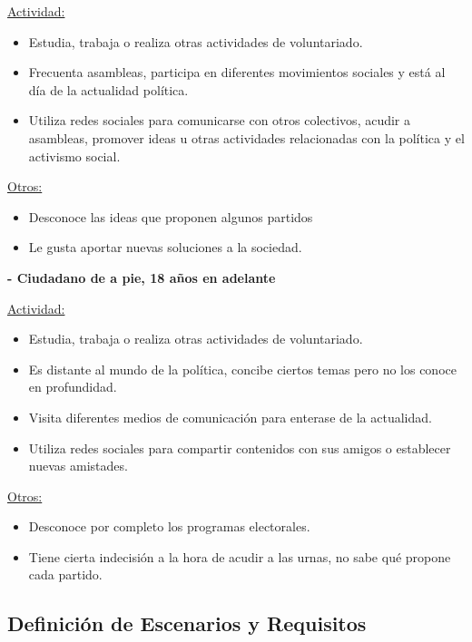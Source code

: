 \underline{Actividad:}

\begin{itemize}
\item Estudia, trabaja o realiza otras actividades de voluntariado.
\item Frecuenta asambleas, participa en diferentes movimientos sociales y está al día de la actualidad política.
\item Utiliza redes sociales para comunicarse con otros colectivos, acudir a asambleas, promover ideas u otras actividades relacionadas con la política y el activismo social.
\end{itemize}

\underline{Otros:}

\begin{itemize}
\item Desconoce las ideas que proponen algunos partidos 
\item Le gusta aportar nuevas soluciones a la sociedad.
\end{itemize}

\textbf{- Ciudadano de a pie, 18 años en adelante}

\underline{Actividad:}

\begin{itemize}
\item Estudia, trabaja o realiza otras actividades de voluntariado.
\item Es distante al mundo de la política, concibe ciertos temas pero no los conoce en profundidad.
\item Visita diferentes medios de comunicación para enterase de la actualidad.
\item Utiliza redes sociales para compartir contenidos con sus amigos o establecer nuevas amistades.
\end{itemize}

\underline{Otros:}

\begin{itemize}
\item Desconoce por completo los programas electorales. 
\item Tiene cierta indecisión a la hora de acudir a las urnas, no sabe qué propone cada partido.
\end{itemize}

\subsection{Definición de Escenarios y Requisitos}

